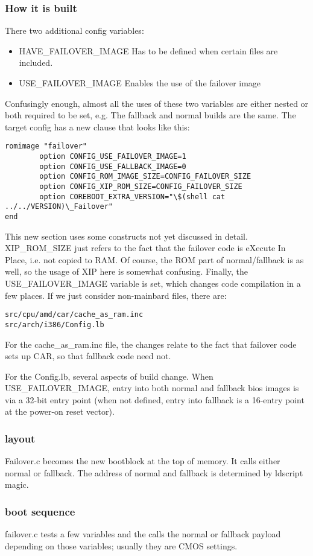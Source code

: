 \documentclass[titlepage,12pt]{article}
\begin{document}
\subsubsection{How it is built}
There two additional config variables: 
\begin{itemize}
\item HAVE\_FAILOVER\_IMAGE Has to be defined when certain files are included. 
\item USE\_FAILOVER\_IMAGE Enables the use of the failover image
\end{itemize}
Confusingly enough, almost all the uses of these two variables are either nested or both required to be set, e.g. 
The fallback and normal builds are the same. The target config has a new clause that looks like this: 
\begin{verbatim}
romimage "failover"
        option CONFIG_USE_FAILOVER_IMAGE=1
        option CONFIG_USE_FALLBACK_IMAGE=0
        option CONFIG_ROM_IMAGE_SIZE=CONFIG_FAILOVER_SIZE
        option CONFIG_XIP_ROM_SIZE=CONFIG_FAILOVER_SIZE
        option COREBOOT_EXTRA_VERSION="\$(shell cat ../../VERSION)\_Failover"
end
\end{verbatim}
This new section uses some constructs not yet discussed in detail. XIP\_ROM\_SIZE just refers to the 
fact that the failover code is eXecute In Place, i.e. not copied to RAM. Of course, the ROM part of normal/fallback is as well, so the usage of XIP here is somewhat confusing. Finally, the USE\_FAILOVER\_IMAGE variable is set, which changes code compilation in a few places. If we just consider non-mainbard files, there are: 
\begin{verbatim}
src/cpu/amd/car/cache_as_ram.inc
src/arch/i386/Config.lb
\end{verbatim}
For the cache\_as\_ram.inc file, the changes relate to the fact that failover code sets up CAR, so that fallback code need not.

For the Config.lb, several aspects of build change. 
When USE\_FAILOVER\_IMAGE, entry into both normal and fallback bios images is via a 32-bit entry point (when not defined, entry into fallback is a 16-entry point at the power-on reset vector). 
\subsubsection{layout}
Failover.c becomes the new bootblock at the top of memory. It calls either normal or fallback. The address of normal and fallback is determined by ldscript magic. 
\subsubsection{boot sequence}
failover.c tests a few variables and the calls the normal or fallback payload depending on those variables; usually they are CMOS settings. 
\end{document}
